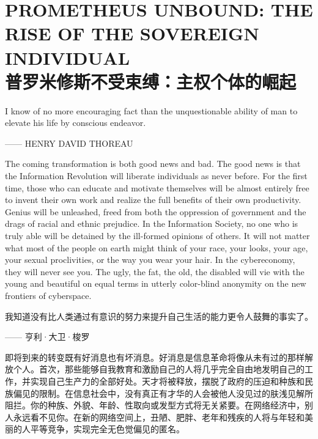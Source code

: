 \section[主权个体的崛起]{PROMETHEUS UNBOUND: THE RISE OF THE SOVEREIGN INDIVIDUAL\\普罗米修斯不受束缚：主权个体的崛起}
\begin{paracol}{2}[]

\begin{tcolorbox}
I know of no more encouraging fact than the unquestionable ability of man to elevate his life by conscious endeavor.
\begin{flushright}
—— HENRY DAVID THOREAU
\end{flushright}
\end{tcolorbox}

The coming transformation is both good news and bad. The good news is that the Information Revolution will liberate individuals as never before. For the first time, those who can educate and motivate themselves will be almost entirely free to invent their own work and realize the full benefits of their own productivity. Genius will be unleashed, freed from both the oppression of government and the drags of racial and ethnic prejudice. In the Information Society, no one who is truly able will be detained by the ill-formed opinions of others. It will not matter what most of the people on earth might think of your race, your looks, your age, your sexual proclivities, or the way you wear your hair. In the cybereconomy, they will never see you. The ugly, the fat, the old, the disabled will vie with the young and beautiful on equal terms in utterly color-blind anonymity on the new frontiers of cyberspace.
\switchcolumn

\begin{tcolorbox}
我知道没有比人类通过有意识的努力来提升自己生活的能力更令人鼓舞的事实了。
\begin{flushright}
—— 亨利·大卫·梭罗
\end{flushright}
\end{tcolorbox}

即将到来的转变既有好消息也有坏消息。好消息是信息革命将像从未有过的那样解放个人。首次，那些能够自我教育和激励自己的人将几乎完全自由地发明自己的工作，并实现自己生产力的全部好处。天才将被释放，摆脱了政府的压迫和种族和民族偏见的限制。在信息社会中，没有真正有才华的人会被他人没见过的肤浅见解所阻拦。你的种族、外貌、年龄、性取向或发型方式将无关紧要。在网络经济中，别人永远看不见你。在新的网络空间上，丑陋、肥胖、老年和残疾的人将与年轻和美丽的人平等竞争，实现完全无色觉偏见的匿名。
\end{paracol}

